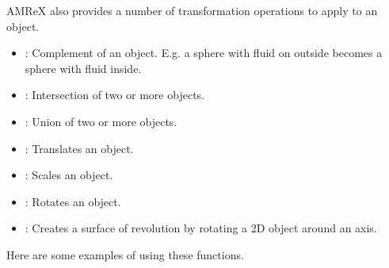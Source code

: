 \documentclass[letterpaper,10pt,english]{sphinxmanual}
\begin{document}
\sphinxAtStartPar
AMReX also provides a number of transformation operations to apply to an object.
\begin{itemize}
\item {} 
\sphinxAtStartPar
{}: Complement of an object. E.g. a sphere with fluid on
outside becomes a sphere with fluid inside.

\item {} 
\sphinxAtStartPar
{}: Intersection of two or more objects.

\item {} 
\sphinxAtStartPar
{}: Union of two or more objects.

\item {} 
\sphinxAtStartPar
{}: Translates an object.

\item {} 
\sphinxAtStartPar
{}: Scales an object.

\item {} 
\sphinxAtStartPar
{}: Rotates an object.

\item {} 
\sphinxAtStartPar
{}: Creates a surface of revolution by rotating a 2D object around an axis.

\end{itemize}

\sphinxAtStartPar
Here are some examples of using these functions.
\end{document}
